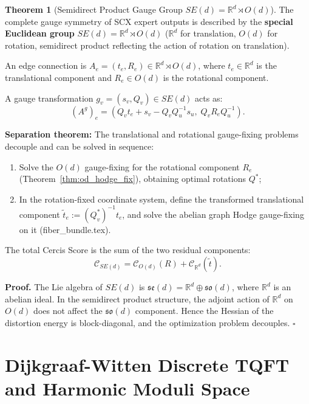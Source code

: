 \documentclass[12pt,a4paper]{article}
\theoremstyle{definition}
\newtheorem{theorem}{Theorem}[section]
\theoremstyle{remark}
\theoremstyle{definition}
\newcommand{\R}{\mathbb{R}}
\newcommand{\Od}{O(d)}
\newcommand{\SEN}{SE(d)}
\newcommand{\cercis}{\mathcal{C}}
\begin{document}
\begin{theorem}[Semidirect Product Gauge Group $\SEN = \R^d \rtimes \Od$]\label{thm:se_gauge}
The complete gauge symmetry of SCX expert outputs is described by the \textbf{special Euclidean group} $\SEN = \R^d \rtimes \Od$
($\R^d$ for translation, $\Od$ for rotation, semidirect product reflecting the action of rotation on translation).

An edge connection is $A_e = (t_e, R_e) \in \R^d \rtimes \Od$, where $t_e \in \R^d$ is the translational component and
$R_e \in \Od$ is the rotational component.

A gauge transformation $g_v = (s_v, Q_v) \in \SEN$ acts as:
\[
    (A^g)_e = (Q_v t_e + s_v - Q_v Q_u^{-1} s_u,\; Q_v R_e Q_u^{-1}).
\]

\textbf{Separation theorem:} The translational and rotational gauge-fixing problems decouple and can be solved in sequence:
\begin{enumerate}[label=(\alph*)]
    \item Solve the $O(d)$ gauge-fixing for the rotational component $R_e$ (Theorem~\ref{thm:od_hodge_fix}), obtaining optimal rotations $Q^*$;
    \item In the rotation-fixed coordinate system, define the transformed translational component
    $\tilde{t}_e := (Q^*_v)^{-1} t_e$, and solve the abelian graph Hodge gauge-fixing on it (fiber\_bundle.tex).
\end{enumerate}

The total Cercis Score is the sum of the two residual components:
\[
    \cercis_{\SEN} = \cercis_{\Od}(R) + \cercis_{\R^d}(\tilde{t}).
\]

\textbf{Proof.}
The Lie algebra of $\SEN$ is $\mathfrak{se}(d) = \R^d \oplus \mathfrak{so}(d)$, where $\R^d$ is an abelian ideal.
In the semidirect product structure, the adjoint action of $\R^d$ on $\Od$ does not affect the $\mathfrak{so}(d)$ component.
Hence the Hessian of the distortion energy is block-diagonal, and the optimization problem decouples. $\square$
\end{theorem}

\newpage

\section{Dijkgraaf-Witten Discrete TQFT and Harmonic Moduli Space}
\label{sec:dw}
\end{document}
